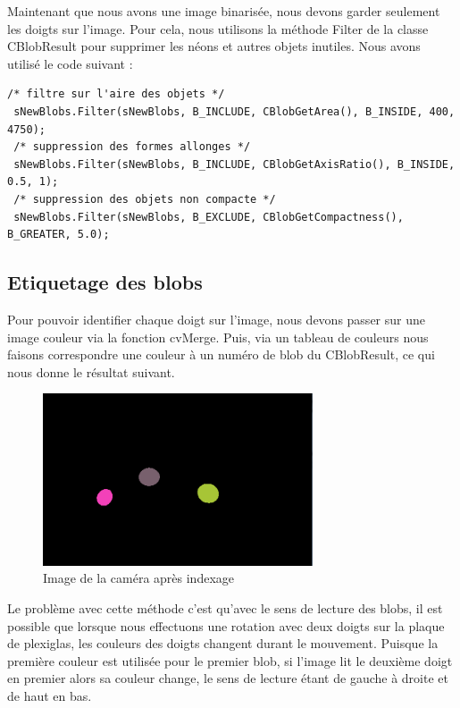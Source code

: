 Maintenant que nous avons une image binarisée, nous devons garder seulement les doigts sur l'image. Pour cela, 
nous utilisons la méthode Filter de la classe CBlobResult pour supprimer les néons et autres objets inutiles.
Nous avons utilisé le code suivant :\\
\begin{lstlisting}[caption=Filtrage des blobs via la fonction Filter]
 /* filtre sur l'aire des objets */
 sNewBlobs.Filter(sNewBlobs, B_INCLUDE, CBlobGetArea(), B_INSIDE, 400, 4750);
 /* suppression des formes allonges */
 sNewBlobs.Filter(sNewBlobs, B_INCLUDE, CBlobGetAxisRatio(), B_INSIDE, 0.5, 1);
 /* suppression des objets non compacte */
 sNewBlobs.Filter(sNewBlobs, B_EXCLUDE, CBlobGetCompactness(), B_GREATER, 5.0);
\end{lstlisting}



\subsection{Etiquetage des blobs}

Pour pouvoir identifier chaque doigt sur l'image, nous devons passer sur une image couleur via la fonction cvMerge.
Puis, via un tableau de couleurs nous faisons correspondre une couleur à un numéro de blob du CBlobResult, ce qui nous donne
le résultat suivant.\\

\begin{figure}[H]
      \center
      \includegraphics[width=8cm]{ressources/tp5/3-flux_indexe.png}
      \caption{Image de la caméra après indexage}
\end{figure}

Le problème avec cette méthode c'est qu'avec le sens de lecture des blobs, il est possible que lorsque nous effectuons 
une rotation avec deux doigts sur la plaque de plexiglas, les couleurs des doigts changent durant le mouvement.
Puisque la première couleur est utilisée pour le premier blob, si l'image lit le deuxième doigt en premier alors sa couleur
change, le sens de lecture étant de gauche à droite et de haut en bas.
